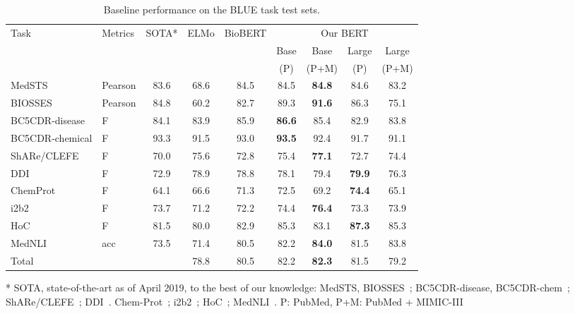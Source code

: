 \documentclass[11pt,a4paper]{article}
\begin{document}
\begin{table*}[!ht]
\centering
\begin{threeparttable}
\begin{tabularx}{\textwidth}{Xlccccccc}
\toprule
\multirow{3}{*}{Task} & \multirow{3}{*}{Metrics} &  \multirow{3}{*}{SOTA*} & \multirow{3}{*}{ELMo} & \multirow{3}{*}{BioBERT} & \multicolumn{4}{c}{Our BERT}\\
\cmidrule{6-9}
 &  &  &  &  & Base & Base & Large & Large\\
 &  &  &  &  & (P) & (P+M) & (P) & (P+M) \\
\midrule
MedSTS & Pearson & 83.6 & 68.6 & 84.5 & 84.5 & \textbf{84.8} & 84.6 & 83.2\\
BIOSSES & Pearson & 84.8 & 60.2 & 82.7 & 89.3 & \textbf{91.6} & 86.3 & 75.1\\
BC5CDR-disease & F & 84.1 & 83.9 & 85.9 & \textbf{86.6} & 85.4 & 82.9 & 83.8\\
BC5CDR-chemical & F & 93.3 & 91.5 & 93.0 & \textbf{93.5} & 92.4 & 91.7 & 91.1\\
ShARe/CLEFE & F & 70.0 & 75.6 & 72.8 & 75.4 & \textbf{77.1} & 72.7 & 74.4\\
DDI & F & 72.9 & 78.9 & 78.8 & 78.1 & 79.4 & \textbf{79.9} & 76.3\\
ChemProt & F & 64.1 & 66.6 & 71.3 & 72.5 & 69.2 & \textbf{74.4} & 65.1\\
i2b2 & F & 73.7 & 71.2 & 72.2 & 74.4 & \textbf{76.4} & 73.3 & 73.9\\
HoC & F & 81.5 & 80.0 & 82.9 & 85.3 & 83.1 & \textbf{87.3} & 85.3\\
MedNLI & acc & 73.5 & 71.4 & 80.5 & 82.2 & \textbf{84.0} & 81.5 & 83.8\\
\midrule
Total &  &  & 78.8 &  80.5 & 82.2 & \textbf{82.3} & 81.5 & 79.2\\
\bottomrule
\end{tabularx}
\begin{tablenotes}
\item[*] SOTA, state-of-the-art as of April 2019, to the best of our knowledge: MedSTS, BIOSSES~\cite{chen2018biosentvec}; BC5CDR-disease, BC5CDR-chem~\cite{yoon2018collabonet}; ShARe/CLEFE~\cite{leaman2015challengesa}; DDI~\cite{zhang2018drug}. Chem-Prot~\cite{peng2018extracting}; i2b2~\cite{rink2011automatic}; HoC~\cite{du2018ml}; MedNLI~\cite{romanov2018lessons}. P: PubMed, P+M: PubMed + MIMIC-III
\end{tablenotes}
\end{threeparttable}
\caption{Baseline performance on the BLUE task test sets.}
\label{tab:results}
\end{table*}
\end{document}
